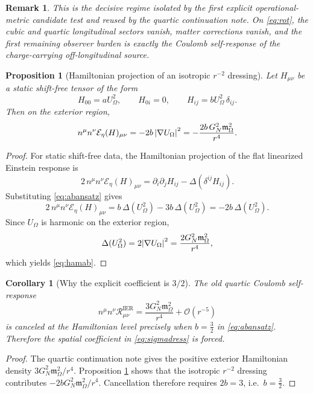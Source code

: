 \documentclass[11pt]{article}
\newcommand{\EinLinFlat}{\mathcal E_{\eta}}
\newcommand{\HamChargeOmega}{\mathfrak m_{\Omega}}
\newtheorem{proposition}{Proposition}
\newtheorem{remark}{Remark}
\newtheorem{corollary}{Corollary}
\begin{document}
\begin{remark}
This is the decisive regime isolated by the first explicit operational-metric candidate test and reused by the quartic continuation note. On \eqref{eq:rot}, the cubic and quartic longitudinal sectors vanish, matter corrections vanish, and the first remaining observer burden is exactly the Coulomb self-response of the charge-carrying off-longitudinal source.
\end{remark}

\begin{proposition}[Hamiltonian projection of an isotropic \(r^{-2}\) dressing]
\label{prop:hamdress}
Let \(H_{\mu\nu}\) be a static shift-free tensor of the form
\begin{equation}
H_{00}=aU_\Omega^2,
\qquad
H_{0i}=0,
\qquad
H_{ij}=bU_\Omega^2\,\delta_{ij}.
\label{eq:abansatz}
\end{equation}
Then on the exterior region,
\begin{equation}
n^\mu n^\nu \EinLinFlat(H)_{\mu\nu}
=
-2b\,\abs{\nabla U_\Omega}^2
=
-\frac{2b\,G_N^2\HamChargeOmega^2}{r^4}.
\label{eq:hamab}
\end{equation}
\end{proposition}

\begin{proof}
For static shift-free data, the Hamiltonian projection of the flat linearized Einstein response is
\[
2\,n^\mu n^\nu \EinLinFlat(H)_{\mu\nu}
=
\partial_i\partial_j H_{ij}
-\Delta(\delta^{ij}H_{ij}).
\]
Substituting \eqref{eq:abansatz} gives
\[
2\,n^\mu n^\nu \EinLinFlat(H)_{\mu\nu}
=
b\,\Delta(U_\Omega^2)-3b\,\Delta(U_\Omega^2)
=
-2b\,\Delta(U_\Omega^2).
\]
Since \(U_\Omega\) is harmonic on the exterior region,
\[
\Delta(U_\Omega^2)=2\abs{\nabla U_\Omega}^2
=
\frac{2G_N^2\HamChargeOmega^2}{r^4},
\]
which yields \eqref{eq:hamab}.
\end{proof}

\begin{corollary}[Why the explicit coefficient is \(3/2\)]
\label{cor:b}
The old quartic Coulomb self-response
\[
n^\mu n^\nu \mathcal R_{\mu\nu}^{\mathrm{IER}}
=
\frac{3G_N^2\HamChargeOmega^2}{r^4}
+\mathcal O(r^{-5})
\]
is canceled at the Hamiltonian level precisely when \(b=\frac32\) in \eqref{eq:abansatz}. Therefore the spatial coefficient in \eqref{eq:sigmadress} is forced.
\end{corollary}

\begin{proof}
The quartic continuation note gives the positive exterior Hamiltonian density \(3G_N^2\HamChargeOmega^2/r^4\). Proposition \ref{prop:hamdress} shows that the isotropic \(r^{-2}\) dressing contributes \(-2bG_N^2\HamChargeOmega^2/r^4\). Cancellation therefore requires \(2b=3\), i.e.\ \(b=\frac32\).
\end{proof}
\end{document}
